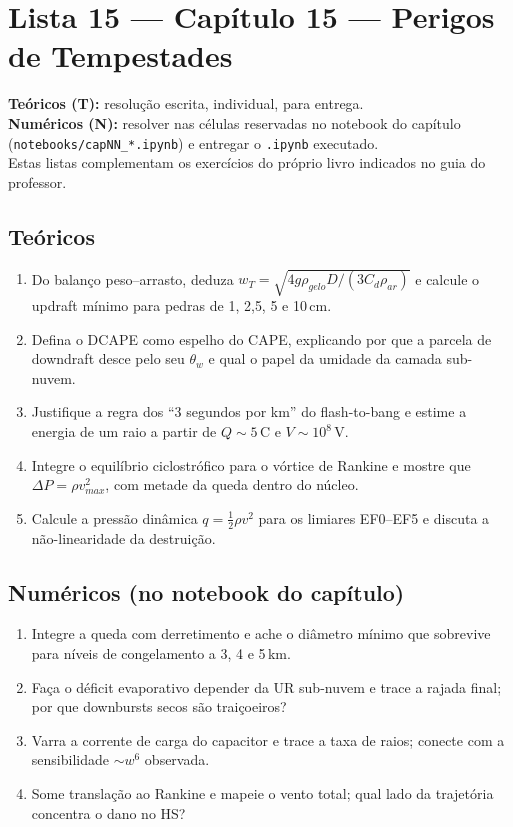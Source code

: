 \documentclass[11pt]{article}
\newcommand{\instrucoes}{%
\begin{caixalista}
\textbf{Teóricos (T):} resolução escrita, individual, para entrega.\\
\textbf{Numéricos (N):} resolver nas células reservadas no notebook do
capítulo (\texttt{notebooks/capNN\_*.ipynb}) e entregar o
\texttt{.ipynb} executado.\\
Estas listas complementam os exercícios do próprio livro indicados no
guia do professor.
\end{caixalista}}
\begin{document}
\clearpage
\section*{Lista 15 --- Capítulo 15 --- Perigos de Tempestades}
\instrucoes

\subsection*{Teóricos}

\begin{enumerate}[label=\textbf{T\arabic*.},itemsep=4pt]
  \item Do balanço peso--arrasto, deduza
        $w_T = \sqrt{4g\rho_{gelo}D/(3C_d\rho_{ar})}$ e calcule o
        updraft mínimo para pedras de 1, 2{,}5, 5 e 10\,cm.
  \item Defina o DCAPE como espelho do CAPE, explicando por que a
        parcela de downdraft desce pelo seu $\theta_w$ e qual o papel
        da umidade da camada sub-nuvem.
  \item Justifique a regra dos ``3 segundos por km'' do flash-to-bang
        e estime a energia de um raio a partir de $Q \sim 5$\,C e
        $V \sim 10^8$\,V.
  \item Integre o equilíbrio ciclostrófico para o vórtice de Rankine e
        mostre que $\Delta P = \rho v_{max}^2$, com metade da queda
        dentro do núcleo.
  \item Calcule a pressão dinâmica $q = \tfrac12\rho v^2$ para os
        limiares EF0--EF5 e discuta a não-linearidade da destruição.
\end{enumerate}

\subsection*{Numéricos (no notebook do capítulo)}

\begin{enumerate}[label=\textbf{N\arabic*.},itemsep=4pt]
  \item Integre a queda com derretimento e ache o diâmetro mínimo que
        sobrevive para níveis de congelamento a 3, 4 e 5\,km.
  \item Faça o déficit evaporativo depender da UR sub-nuvem e trace a
        rajada final; por que downbursts secos são traiçoeiros?
  \item Varra a corrente de carga do capacitor e trace a taxa de
        raios; conecte com a sensibilidade $\sim w^6$ observada.
  \item Some translação ao Rankine e mapeie o vento total; qual lado
        da trajetória concentra o dano no HS?
\end{enumerate}
\end{document}
